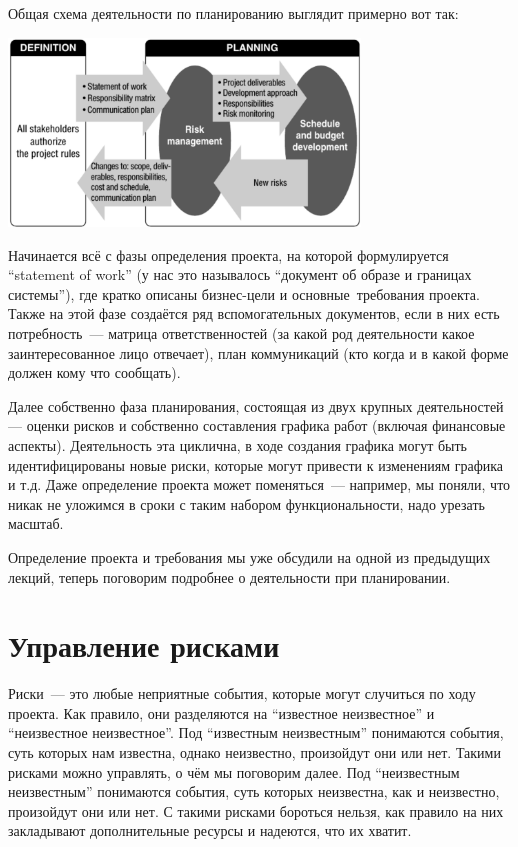 \documentclass{../../text-style}
\begin{document}
Общая схема деятельности по планированию выглядит примерно вот так:

\begin{center}
    \includegraphics[width=0.7\textwidth]{planning.png}
\end{center}

Начинается всё с фазы определения проекта, на которой формулируется \enquote{statement of work} (у нас это называлось \enquote{документ об образе и границах системы}), где кратко описаны бизнес-цели и основные~требования проекта. Также на этой фазе создаётся ряд вспомогательных документов, если в них есть потребность~--- матрица ответственностей (за какой род деятельности какое заинтересованное лицо отвечает), план коммуникаций (кто когда и в какой форме должен кому что сообщать). 

Далее собственно фаза планирования, состоящая из двух крупных деятельностей --- оценки рисков и собственно составления графика работ (включая финансовые аспекты). Деятельность эта циклична, в ходе создания графика могут быть идентифицированы новые риски, которые могут привести к изменениям графика и т.д. Даже определение проекта может поменяться~--- например, мы поняли, что никак не уложимся в сроки с таким набором функциональности, надо урезать масштаб.

Определение проекта и требования мы уже обсудили на одной из предыдущих лекций, теперь поговорим подробнее о деятельности при планировании.

\section{Управление рисками}

Риски~--- это любые неприятные события, которые могут случиться по ходу проекта. Как правило, они разделяются на \enquote{известное неизвестное} и \enquote{неизвестное неизвестное}. Под \enquote{известным неизвестным} понимаются события, суть которых нам известна, однако неизвестно, произойдут они или нет. Такими рисками можно управлять, о чём мы поговорим далее. Под \enquote{неизвестным неизвестным} понимаются события, суть которых неизвестна, как и неизвестно, произойдут они или нет. С такими рисками бороться нельзя, как правило на них закладывают дополнительные ресурсы и надеются, что их хватит.
\end{document}
